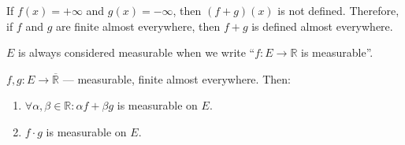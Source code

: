 \begin{observation}
    If $f(x) = +\infty$ and $g(x) = -\infty$, then $(f + g)(x)$ is not defined.
    Therefore, if $f$ and $g$ are finite almost everywhere, then
    $f + g$ is defined almost everywhere.
\end{observation}
\begin{remark}
    $E$ is always considered measurable when we write ``$f : E \to \mathbb{R}$ is measurable''.
\end{remark}
\begin{theorem}
    $f, g : E \to \overline{\mathbb{R}}$ --- measurable, finite almost everywhere.
    Then:
    \begin{enumerate}
        \item {
            $\forall \alpha, \beta \in \mathbb{R}: \alpha f + \beta g$ is measurable
            on $E$.
        }
        \item {
            $f \cdot g$ is measurable on $E$.
        }
    \end{enumerate}
\end{theorem}
